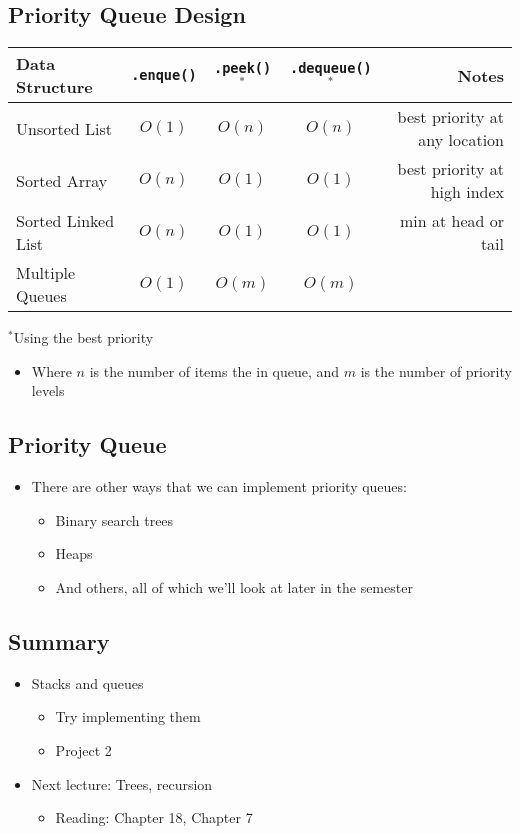 \documentclass[10pt]{article}
\begin{document}
\subsection*{Priority Queue Design}
\begin{center}
    \begin{tabular}{lcccr} \toprule
        Data Structure & \texttt{.enque()} & \texttt{.peek()}$^*$ & \texttt{.dequeue()}$^*$ & Notes \\ \midrule
        Unsorted List & $O(1)$ & $O(n)$ & $O(n)$ & best priority at any location \\
        Sorted Array & $O(n)$ & $O(1)$ & $O(1)$ & best priority at high index \\
        Sorted Linked List & $O(n)$ & $O(1)$ & $O(1)$ & min at head or tail \\ 
        Multiple Queues & $O(1)$ & $O(m)$ & $O(m)$ & \\\bottomrule
    \end{tabular}
    \begin{center}$^*$Using the best priority\end{center}
\end{center}
\begin{itemize}
    \item Where $n$ is the number of items the in queue, and $m$ is the number of priority levels
\end{itemize}

\subsection*{Priority Queue}
\begin{itemize}
    \item There are other ways that we can implement priority queues:
    \begin{itemize}
        \item Binary search trees
        \item Heaps
        \item And others, all of which we'll look at later in the semester
    \end{itemize}
\end{itemize}

\subsection*{Summary}
\begin{itemize}
    \item Stacks and queues
    \begin{itemize}
        \item Try implementing them
        \item Project 2
    \end{itemize}
    \item Next lecture: Trees, recursion
    \begin{itemize}
        \item Reading: Chapter 18, Chapter 7
    \end{itemize}
\end{itemize}
\end{document}
